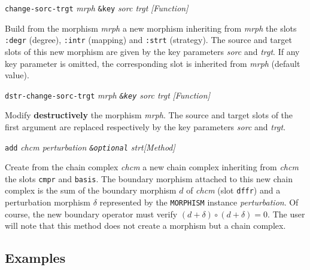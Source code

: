 \newpage
{\parindent=0mm
{\leftskip=5mm
{\tt change-sorc-trgt} {\em mrph} {\tt \&key} {\em sorc trgt} \hfill {\em [Function]} \par}
{\leftskip=15mm
Build from the morphism {\em mrph} a new morphism inheriting from
{\em mrph} the slots {\tt :degr} (degree), {\tt :intr} (mapping) and
{\tt :strt} (strategy). The source  and target slots of this new morphism are given
by the key parameters {\em sorc} and {\em trgt}. If any
key parameter is omitted, the corresponding slot is
inherited from {\em mrph} (default value). \par}
{\leftskip=5mm
{\tt dstr-change-sorc-trgt} {\em mrph {\tt \&key}  sorc trgt} \hfill {\em [Function]} \par}
{\leftskip=15mm
Modify {\bf destructively} the morphism {\em mrph}. The source  and target slots of the first argument
are replaced respectively by the key parameters {\em sorc} and {\em trgt}. \par}
{\leftskip=5mm
{\tt add} {\em chcm perturbation {\tt \&optional} strt}\hfill {\em [Method]} \par}
{\leftskip=15mm
Create from the chain complex {\em chcm} a new chain complex inheriting
from {\em chcm} the slots {\tt cmpr} and {\tt basis}. The boundary morphism
attached to this new chain complex  is the sum of the boundary morphism $d$
of {\em chcm} (slot {\tt dffr}) and a perturbation morphism $\delta$ represented by
the {\tt MORPHISM} instance {\em perturbation}. Of course, the new boundary operator
must verify $(d+\delta)\circ (d+\delta)=0$. The user will note that this method
does not create a morphism but a chain complex.\par}
}

\newpage

\subsection*{Examples}


